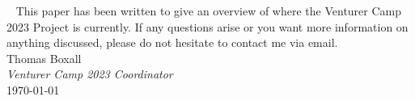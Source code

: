 \documentclass[a4paper, 11pt]{report}
\begin{document}
    \begin{titlepage}
    
    \end{titlepage}
    \ 
    \vfill
    This paper has been written to give an overview of where the Venturer Camp 2023 Project is currently. If any questions arise or you want more information on anything discussed, please do not hesitate to contact me via email.\\[1em]
    Thomas Boxall\\
    \textit{Venturer Camp 2023 Coordinator}\\[1em]
    \today
    \vfill

    \tableofcontents
    
    
    
    
    
    

    \backPage
\end{document}
